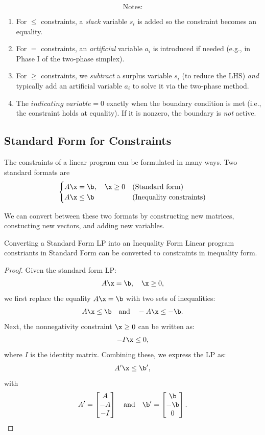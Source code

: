 \[
\text{Notes:}
\]
\begin{enumerate}
\item  For \(\le\) constraints, a \emph{slack} variable \(s_i\) is added so the constraint becomes an equality.  
\item  For \(=\) constraints, an \emph{artificial} variable \(a_i\) is introduced if needed (e.g., in Phase I of the two-phase simplex).  
\item For \(\ge\) constraints, we \emph{subtract} a surplus variable \(s_i\) (to reduce the LHS) \emph{and} typically add an artificial variable \(a_i\) to solve it via the two-phase method.  
\item  The \(\textit{indicating variable} = 0\) exactly when the boundary condition is met (i.e., the constraint holds at equality). If it is nonzero, the boundary is \textit{not} active.
\end{enumerate}





\subsection{Standard Form for Constraints}

The constraints of a linear program can be formulated in many ways.  Two standard formats are 
\begin{align*}
    \begin{cases}
        A\x = \b, \quad \x \geq 0 & \text{(Standard form)} \\
        A\x \leq\b& \text{(Inequality constraints)}
    \end{cases}
\end{align*}

We can convert between these two formats by constructing new matrices, constucting new vectors, and adding new variables.

\begin{proposition}{Converting a Standard Form LP into an Inequality Form}{}{}
Linear program constriants in Standard Form can be converted to constraints in inequality form.
\end{proposition}
\begin{proof}
Given the standard form LP:
\[
A\x = \b, \quad \x \geq 0,
\]
we first replace the equality \(A\x = \b\) with two sets of inequalities:
\[
A\x \leq\b\quad \text{and} \quad -A\x \leq -\b.
\]
Next, the nonnegativity constraint \(\x \geq 0\) can be written as:
\[
-I\x \leq 0,
\]
where \(I\) is the identity matrix. Combining these, we express the LP as:
\[
A'\x \leq \b',
\]
with
\[
A' = \begin{bmatrix}
A \\
-A \\
-I
\end{bmatrix}
\quad \text{and} \quad
\b' = \begin{bmatrix}
\b \\
-\b \\
0
\end{bmatrix}.
\]
\end{proof}

